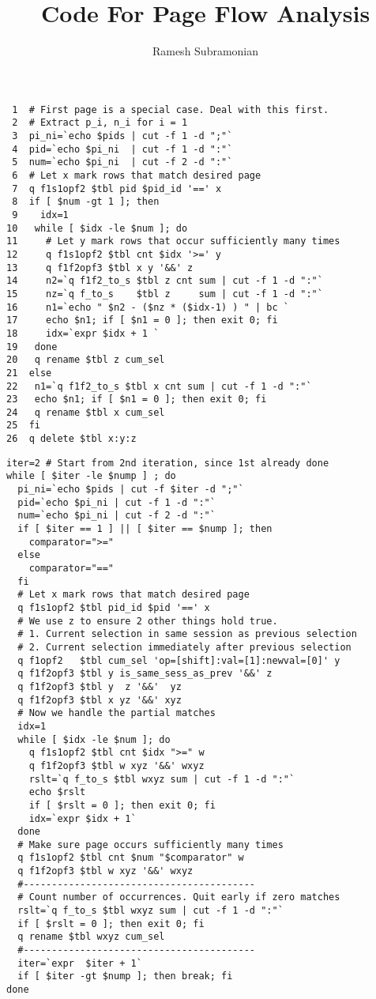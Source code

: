 \documentclass[letterpaper]{article}
\begin{document}
\title{Code For Page Flow Analysis}
\author{ Ramesh Subramonian }
\maketitle
\thispagestyle{fancy}
\cfoot{}
\rfoot{{\small \thepage}}

\begin{verbatim}
 1  # First page is a special case. Deal with this first.
 2  # Extract p_i, n_i for i = 1
 3  pi_ni=`echo $pids | cut -f 1 -d ";"`
 4  pid=`echo $pi_ni  | cut -f 1 -d ":"`
 5  num=`echo $pi_ni  | cut -f 2 -d ":"`
 6  # Let x mark rows that match desired page
 7  q f1s1opf2 $tbl pid $pid_id '==' x
 8  if [ $num -gt 1 ]; then
 9    idx=1
10   while [ $idx -le $num ]; do
11     # Let y mark rows that occur sufficiently many times
12     q f1s1opf2 $tbl cnt $idx '>=' y
13     q f1f2opf3 $tbl x y '&&' z
14     n2=`q f1f2_to_s $tbl z cnt sum | cut -f 1 -d ":"`
15     nz=`q f_to_s    $tbl z     sum | cut -f 1 -d ":"`
16     n1=`echo " $n2 - ($nz * ($idx-1) ) " | bc `
17     echo $n1; if [ $n1 = 0 ]; then exit 0; fi
18     idx=`expr $idx + 1 `
19   done
20   q rename $tbl z cum_sel
21  else
22   n1=`q f1f2_to_s $tbl x cnt sum | cut -f 1 -d ":"`
23   echo $n1; if [ $n1 = 0 ]; then exit 0; fi
24   q rename $tbl x cum_sel
25  fi
26  q delete $tbl x:y:z
\end{verbatim}

\newpage

\begin{verbatim}
iter=2 # Start from 2nd iteration, since 1st already done
while [ $iter -le $nump ] ; do
  pi_ni=`echo $pids | cut -f $iter -d ";"`
  pid=`echo $pi_ni | cut -f 1 -d ":"`
  num=`echo $pi_ni | cut -f 2 -d ":"`
  if [ $iter == 1 ] || [ $iter == $nump ]; then
    comparator=">="
  else
    comparator="=="
  fi
  # Let x mark rows that match desired page
  q f1s1opf2 $tbl pid_id $pid '==' x
  # We use z to ensure 2 other things hold true. 
  # 1. Current selection in same session as previous selection
  # 2. Current selection immediately after previous selection
  q f1opf2   $tbl cum_sel 'op=[shift]:val=[1]:newval=[0]' y
  q f1f2opf3 $tbl y is_same_sess_as_prev '&&' z
  q f1f2opf3 $tbl y  z '&&'  yz
  q f1f2opf3 $tbl x yz '&&' xyz
  # Now we handle the partial matches
  idx=1
  while [ $idx -le $num ]; do
    q f1s1opf2 $tbl cnt $idx ">=" w
    q f1f2opf3 $tbl w xyz '&&' wxyz
    rslt=`q f_to_s $tbl wxyz sum | cut -f 1 -d ":"`
    echo $rslt
    if [ $rslt = 0 ]; then exit 0; fi
    idx=`expr $idx + 1`
  done 
  # Make sure page occurs sufficiently many times
  q f1s1opf2 $tbl cnt $num "$comparator" w
  q f1f2opf3 $tbl w xyz '&&' wxyz
  #-----------------------------------------
  # Count number of occurrences. Quit early if zero matches
  rslt=`q f_to_s $tbl wxyz sum | cut -f 1 -d ":"`
  if [ $rslt = 0 ]; then exit 0; fi
  q rename $tbl wxyz cum_sel
  #-----------------------------------------
  iter=`expr  $iter + 1`
  if [ $iter -gt $nump ]; then break; fi
done
\end{verbatim}
\end{document}
